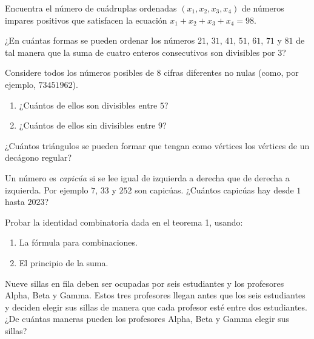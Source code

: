 \begin{problema}
Encuentra el número de cuádruplas ordenadas $(x_1,x_2,x_3,x_4)$ de números impares positivos que satisfacen la ecuación $x_1+x_2+x_3+x_4=98$.
\end{problema}

\begin{problema}
    ¿En cuántas formas se pueden ordenar los números $21$, $31$, $41$, $51$, $61$, $71$ y $81$ de tal manera que la suma de cuatro enteros consecutivos son divisibles por $3$?
\end{problema}

\begin{problema}
Considere todos los números posibles de 8 cifras diferentes no nulas (como, por ejemplo, $73451962$).
\begin{enumerate}
    \item ¿Cuántos de ellos son divisibles entre $5$?
    \item ¿Cuántos de ellos sin divisibles entre $9$?
\end{enumerate}
\end{problema}

\begin{problema}
¿Cuántos triángulos se pueden formar que tengan como vértices los vértices de un decágono regular?
\end{problema}

\begin{problema}
Un número es \textit{capicúa} si se lee igual de izquierda a derecha que de derecha a izquierda. Por ejemplo $7$, $33$ y $252$ son capicúas. ¿Cuántos capicúas hay desde $1$ hasta $2023$?
\end{problema}

\begin{problema}
Probar la identidad combinatoria dada en el teorema 1, usando:
\begin{enumerate}
    \item La fórmula para combinaciones.
    \item El principio de la suma.
\end{enumerate}
\end{problema}

\begin{problema}
    Nueve sillas en fila deben ser ocupadas por seis estudiantes y los profesores Alpha, Beta y Gamma. Estos tres profesores llegan antes que los seis estudiantes y deciden elegir sus sillas de manera que cada profesor esté entre dos estudiantes. ¿De cuántas maneras pueden los profesores Alpha, Beta y Gamma elegir sus sillas?
\end{problema}

